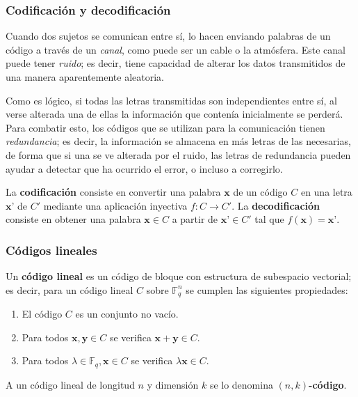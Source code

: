 \subsubsection{Codificación y decodificación}

Cuando dos sujetos se comunican entre sí, lo hacen enviando palabras de un código a través de un \textit{canal}, como puede ser un cable o la atmósfera. Este canal puede tener \textit{ruido}; es decir, tiene capacidad de alterar los datos transmitidos de una manera aparentemente aleatoria.

Como es lógico, si todas las letras transmitidas son independientes entre sí, al verse alterada una de ellas la información que contenía inicialmente se perderá. Para combatir esto, los códigos que se utilizan para la comunicación tienen \textit{redundancia}; es decir, la información se almacena en más letras de las necesarias, de forma que si una se ve alterada por el ruido, las letras de redundancia pueden ayudar a detectar que ha ocurrido el error, o incluso a corregirlo.

\begin{definition}
	La \textbf{codificación} consiste en convertir una palabra $\textbf{x}$ de un código $C$ en una letra $\textbf{x'}$ de $C'$ mediante una aplicación inyectiva $f : C \rightarrow C'$. La \textbf{decodificación} consiste en obtener una palabra $\textbf{x} \in C$ a partir de $\textbf{x'} \in C'$ tal que $f(\textbf{x}) = \textbf{x'}$.
\end{definition}

\subsubsection{Códigos lineales}

\begin{definition}
	Un \textbf{código lineal} es un código de bloque con estructura de subespacio vectorial; es decir, para un código lineal $C$ sobre $\mathbb{F}_q^n$ se cumplen las siguientes propiedades:
	\begin{enumerate}
		\item El código $C$ es un conjunto no vacío.
		\item Para todos $\textbf{x}, \textbf{y} \in C$ se verifica $\textbf{x} + \textbf{y} \in C$.
		\item Para todos $\lambda \in \mathbb{F}_q, \textbf{x} \in C$ se verifica $\lambda\textbf{x} \in C$.
	\end{enumerate}

	A un código lineal de longitud $n$ y dimensión $k$ se lo denomina \textbf{$(n, k)$-código}.
\end{definition}

